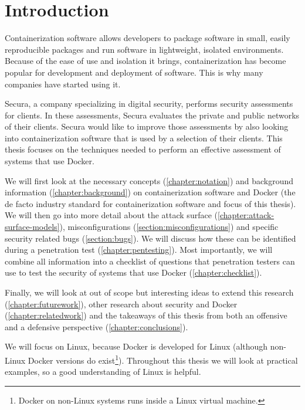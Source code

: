 \chapter{Introduction}
Containerization software allows developers to package software in small, easily reproducible packages and run software in lightweight, isolated environments. Because of the ease of use and isolation it brings, containerization has become popular for development and deployment of software. This is why many companies have started using it.

Secura, a company specializing in digital security, performs security assessments for clients. In these assessments, Secura evaluates the private and public networks of their clients. Secura would like to improve those assessments by also looking into containerization software that is used by a selection of their clients. This thesis focuses on the techniques needed to perform an effective assessment of systems that use Docker.

\medskip

We will first look at the necessary concepts (\autoref{chapter:notation}) and background information (\autoref{chapter:background}) on containerization software and Docker (the de facto industry standard for containerization software and focus of this thesis). We will then go into more detail about the attack surface (\autoref{chapter:attack-surface-models}), misconfigurations (\autoref{section:misconfigurations}) and specific security related bugs (\autoref{section:bugs}). We will discuss how these can be identified during a penetration test (\autoref{chapter:pentesting}). Most importantly, we will combine all information into a checklist of questions that penetration testers can use to test the security of systems that use Docker (\autoref{chapter:checklist}).

Finally, we will look at out of scope but interesting ideas to extend this research (\autoref{chapter:futurework}), other research about security and Docker (\autoref{chapter:relatedwork}) and the takeaways of this thesis from both an offensive and a defensive perspective (\autoref{chapter:conclusions}).

\medskip

We will focus on Linux, because Docker is developed for Linux (although non-Linux Docker versions do exist\footnote{Docker on non-Linux systems runs inside a Linux virtual machine.}). Throughout this thesis we will look at practical examples, so a good understanding of Linux is helpful.
